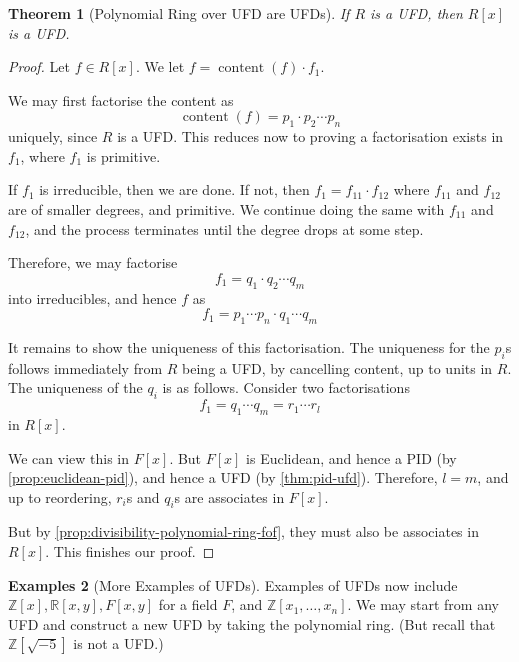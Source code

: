 \documentclass{article}
\newtheorem{theorem}{Theorem}[section]
\theoremstyle{definition}
\newtheorem{examples}[theorem]{Examples}
\theoremstyle{remark}
\newcommand{\pqty}[1]{\left(#1\right)}
\newcommand{\bqty}[1]{\left[#1\right]}
\newcommand{\ZZ}{\mathbb{Z}}
\newcommand{\RR}{\mathbb{R}}
\newcommand{\content}{\operatorname{content}}
\begin{document}
\begin{theorem}[Polynomial Ring over UFD are UFDs]
    \label{thm:poynomial-over-ufd-ufd}%
    If \(R\) is a UFD, then \(R\bqty{x}\) is a UFD.
\end{theorem}

\begin{proof}
    Let \(f \in R\bqty{x}\). We let \(f = \content\pqty{f} \cdot f_1\).

    We may first factorise the content as
    \[
        \content\pqty{f} = p_1 \cdot p_2 \cdots p_n
    \]
    uniquely, since \(R\) is a UFD. This reduces now to proving a factorisation exists in \(f_1\), where \(f_1\) is primitive.

    If \(f_1\) is irreducible, then we are done. If not, then \(f_1 = f_{11} \cdot f_{12}\) where \(f_{11}\) and \(f_{12}\) are of smaller degrees, and primitive. We continue doing the same with \(f_{11}\) and \(f_{12}\), and the process terminates until the degree drops at some step.
    
    Therefore, we may factorise
    \[
        f_1 = q_1 \cdot q_2 \cdots q_m
    \]
    into irreducibles, and hence \(f\) as
    \[
        f_1 = p_1 \cdots p_n \cdot q_1 \cdots q_m
    \]

    It remains to show the uniqueness of this factorisation. The uniqueness for the \(p_i\)s follows immediately from \(R\) being a UFD, by cancelling content, up to units in \(R\). The uniqueness of the \(q_i\) is as follows. Consider two factorisations
    \[
        f_1 = q_1 \cdots q_m = r_1 \cdots r_l
    \]
    in \(R\bqty{x}\).

    We can view this in \(F\bqty{x}\). But \(F\bqty{x}\) is Euclidean, and hence a PID (by \autoref{prop:euclidean-pid}), and hence a UFD (by \autoref{thm:pid-ufd}). Therefore, \(l = m\), and up to reordering, \(r_i\)s and \(q_i\)s are associates in \(F\bqty{x}\).

    But by \autoref{prop:divisibility-polynomial-ring-fof}, they must also be associates in \(R\bqty{x}\). This finishes our proof.
\end{proof}

\begin{examples}[More Examples of UFDs]
    \label{ex:more-examples-ufd}%
    Examples of UFDs now include \(\ZZ\bqty{x}, \RR\bqty{x, y}, F\bqty{x, y}\) for a field \(F\), and \(\ZZ\bqty{x_1, \ldots, x_n}\). We may start from any UFD and construct a new UFD by taking the polynomial ring. (But recall that \(\ZZ\bqty{\sqrt{-5}}\) is not a UFD.)
\end{examples}
\end{document}
